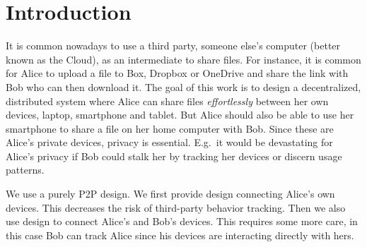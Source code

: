 \section{Introduction}


It is common nowadays to use a third party, \ie someone else's computer (better 
known as the Cloud), as an intermediate to share files.
For instance, it is common for Alice to upload a file to \eg Box, Dropbox or 
OneDrive and share the link with Bob who can then download it.
The goal of this work is to design a decentralized, distributed system where 
Alice can share files \emph{effortlessly} between her own devices, \eg laptop, 
smartphone and tablet.
But Alice should also be able to use her smartphone to share a file on her home 
computer with Bob.
Since these are Alice's private devices, privacy is essential.
E.g.\ it would be devastating for Alice's privacy if Bob could stalk her by 
tracking her devices or discern usage patterns.




We use a purely \ac{P2P} design.
We first provide  design connecting Alice's own devices.
This decreases the risk of third-party behavior tracking.
Then we also use  design to connect Alice's and Bob's devices.
This requires some more care, in this case Bob can track Alice since his devices 
are interacting directly with hers.


